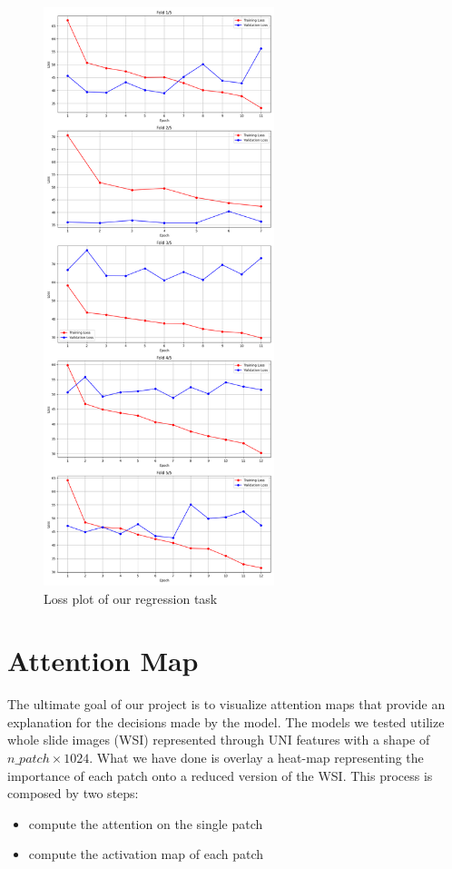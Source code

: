 \documentclass{article}
\begin{document}
\begin{figure}[h]
	\centering
	\includegraphics[width=0.6\textwidth]{images/loss_plot_regression.png}
	\caption{Loss plot of our regression task}
	\label{fig:regloss}
\end{figure}

\clearpage
\section{Attention Map} %
The ultimate goal of our project is to visualize attention maps that provide an explanation for the decisions made by the model. The models we tested utilize whole slide images (WSI) represented through UNI features with a shape of $n\_patch\times1024$. What we have done is overlay a heat-map representing the importance of each patch onto a reduced version of the WSI.
This process is composed by two steps:
\begin{itemize}
	\item compute the attention on the single patch
	\item compute the activation map of each patch
\end{itemize}
\end{document}
